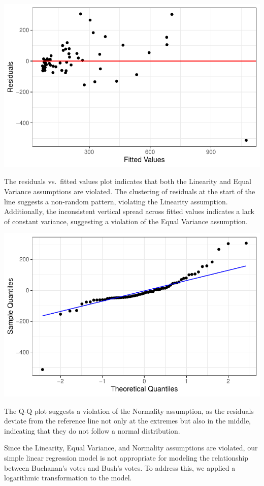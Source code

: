 \documentclass[
  letterpaper,
  DIV=11,
  numbers=noendperiod]{scrartcl}
\begin{document}
\includegraphics{SDS-291-case-study-1_files/figure-pdf/unnamed-chunk-6-1.pdf}

The residuals vs.~fitted values plot indicates that both the Linearity
and Equal Variance assumptions are violated. The clustering of residuals
at the start of the line suggests a non-random pattern, violating the
Linearity assumption. Additionally, the inconsistent vertical spread
across fitted values indicates a lack of constant variance, suggesting a
violation of the Equal Variance assumption.

\includegraphics{SDS-291-case-study-1_files/figure-pdf/unnamed-chunk-7-1.pdf}

The Q-Q plot suggests a violation of the Normality assumption, as the
residuals deviate from the reference line not only at the extremes but
also in the middle, indicating that they do not follow a normal
distribution.

Since the Linearity, Equal Variance, and Normality assumptions are
violated, our simple linear regression model is not appropriate for
modeling the relationship between Buchanan's votes and Bush's votes. To
address this, we applied a logarithmic transformation to the model.
\end{document}
